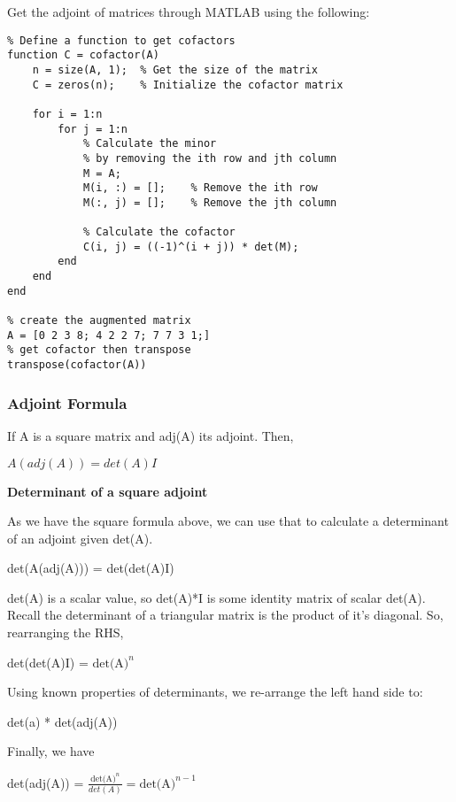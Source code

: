 \documentclass{article}
\newcommand{\sub}[1]{\vspace{10pt}\textbf{#1}}
\begin{document}
\begin{tcolorbox}[title=MATLAB tip, colback=blue!5, colframe=blue!80!black]
    Get the adjoint of matrices through MATLAB using the following:
    \begin{lstlisting}
% Define a function to get cofactors
function C = cofactor(A)
    n = size(A, 1);  % Get the size of the matrix
    C = zeros(n);    % Initialize the cofactor matrix
    
    for i = 1:n
        for j = 1:n
            % Calculate the minor
            % by removing the ith row and jth column
            M = A;
            M(i, :) = [];    % Remove the ith row
            M(:, j) = [];    % Remove the jth column
            
            % Calculate the cofactor
            C(i, j) = ((-1)^(i + j)) * det(M);
        end
    end
end

% create the augmented matrix 
A = [0 2 3 8; 4 2 2 7; 7 7 3 1;]
% get cofactor then transpose
transpose(cofactor(A))
    \end{lstlisting}
\end{tcolorbox}

\subsubsection{Adjoint Formula}
If A is a square matrix and adj(A) its adjoint. Then,
\begin{center}
    $A(adj(A)) = det(A)I$
\end{center}

\sub{Determinant of a square adjoint}

As we have the square formula above, we can use that to calculate a determinant of an adjoint given det(A).
\begin{center}
    det(A(adj(A))) = det(det(A)I)
\end{center}
det(A) is a scalar value, so det(A)*I is some identity matrix of scalar det(A). Recall the determinant of a triangular matrix is the product of it's diagonal. So, rearranging the RHS,
\begin{center}
    det(det(A)I) = $\text{det(A)}^n$
\end{center}
Using known properties of determinants, we re-arrange the left hand side to:
\begin{center}
    det(a) * det(adj(A))
\end{center}

Finally, we have
\begin{center}
    det(adj(A)) = $\frac{\text{det(A)}^n}{det(A)} = \text{det(A)}^{n-1}$
\end{center}
\end{document}

